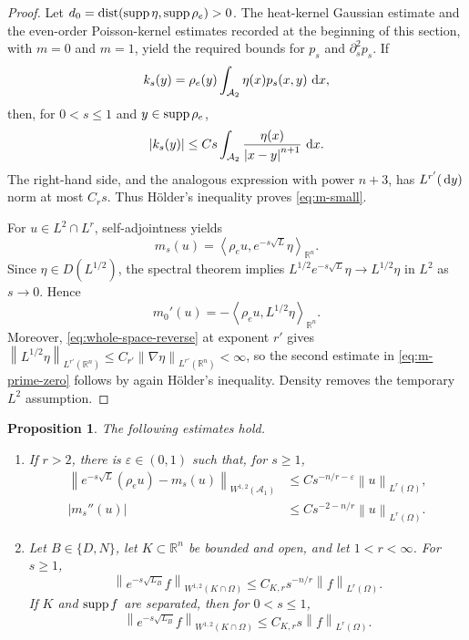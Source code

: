 \documentclass[12pt]{amsart}
\newcommand\R{\mathbb{R}}
\newcommand\dd{\,{\rm d}}
\newcommand{\supp}{{\rm supp}{\hspace{.05cm}}}
\newcommand{\dist}{\operatorname{dist}}
\newcommand{\cA}{\mathcal A}
\newcommand{\ip}[2]{\left\langle #1,#2\right\rangle}
\newcommand{\norm}[2]{\left\lVert #1\right\rVert_{#2}}
\newcommand{\abs}[1]{\left\lvert #1\right\rvert}
\newtheorem{proposition}[theorem]{Proposition}
\theoremstyle{remark}
\begin{document}
\begin{proof}
Let
$d_0=\dist(\supp\eta,\supp\rho_e)>0$.  The heat-kernel Gaussian estimate
and the even-order Poisson-kernel estimates recorded at the beginning of
this section, with $m=0$ and $m=1$, yield the required bounds for $p_s$
and $\partial_s^2p_s$.
If
\[
 k_s(y)=\rho_e(y)\int_{\cA_2}\eta(x)p_s(x,y)\,\dd x,
\]
then, for $0<s\leq1$ and $y\in\supp\rho_e$,
\[
 \abs{k_s(y)}\leq
 Cs\int_{\cA_2}\frac{\eta(x)}{\abs{x-y}^{n+1}}\,\dd x.
\]
The right-hand side, and the analogous expression with power $n+3$, has
$L^{r'}(\dd y)$ norm at most $C_rs$.  Thus H\"older's inequality proves
\eqref{eq:m-small}.

For $u\in L^2\cap L^r$, self-adjointness yields
\[
 m_s(u)=\ip{\rho_eu}{e^{-s\sqrt L}\eta}_{\R^n}.
\]
Since \(\eta\in D(L^{1/2})\), the spectral theorem implies
\(L^{1/2}e^{-s\sqrt L}\eta\to L^{1/2}\eta\) in \(L^2\) as $s\to0$.  Hence
\[
 m_0'(u)
 =-\ip{\rho_eu}{L^{1/2}\eta}_{\R^n}.
\]
Moreover, \eqref{eq:whole-space-reverse} at exponent $r'$ gives $\norm{L^{1/2}\eta}{L^{r'}(\R^n)}\leq C_{r'}\norm{\nabla\eta}{L^{r'}(\R^n)}<\infty$, so the second estimate in \eqref{eq:m-prime-zero} follows by again H\"older's inequality.  Density removes the temporary $L^2$
assumption.
\end{proof}

\begin{proposition}\label{prop:local-Poisson-estimates}
The following estimates hold.
\begin{enumerate}[label=\textup{(\roman*)}]
\item If $r>2$, there is $\varepsilon\in(0,1)$ such that, for $s\geq1$,
\begin{align}
 \norm{e^{-s\sqrt L}(\rho_eu)-m_s(u)}{W^{1,2}(\cA_1)}
 &\leq Cs^{-n/r-\varepsilon}\norm u{L^r(\Omega)},
 \label{eq:centered-W12}\\
 \abs{m_s''(u)}
 &\leq Cs^{-2-n/r}\norm u{L^r(\Omega)}.
 \label{eq:m-second-large}
\end{align}
\item Let $B\in\{D,N\}$, let $K\subset\R^n$ be bounded and open, and let
$1<r<\infty$.  For $s\geq1$,
\begin{equation}\label{eq:domain-local}
 \norm{e^{-s\sqrt{L_B}}f}{W^{1,2}(K\cap\Omega)}
 \leq C_{K,r}s^{-n/r}\norm f{L^r(\Omega)}.
\end{equation}
If $K$ and $\supp f$ are separated, then for $0<s\leq1$,
\begin{equation}\label{eq:domain-small-off}
 \norm{e^{-s\sqrt{L_B}}f}{W^{1,2}(K\cap\Omega)}
 \leq C_{K,r}s\norm f{L^r(\Omega)}.
\end{equation}
\end{enumerate}
\end{proposition}
\end{document}
